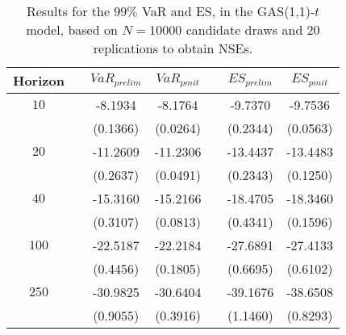 \begin{table}[h] 
\centering 
\caption{Results for the $99\%$ VaR and ES, in the GAS(1,1)-$t$ model, based on $N=10000$ candidate draws and $20$ replications to obtain NSEs.} 
\label{tab:res_pmit_t_gas} 
\begin{tabular}{ccccccc}  
 Horizon & & $VaR_{prelim}$ & $VaR_{pmit}$ & & $ES_{prelim}$ & $ES_{pmit}$ \\ \hline 
$10$ & & -8.1934 & -8.1764 & & -9.7370 & -9.7536  \\ 
 & & (0.1366) & (0.0264) & & (0.2344) & (0.0563)   \\ [1ex] 
$20$ & & -11.2609 & -11.2306 & & -13.4437 & -13.4483  \\ 
 & & (0.2637) & (0.0491) & & (0.2343) & (0.1250)   \\ [1ex] 
$40$ & & -15.3160 & -15.2166 & & -18.4705 & -18.3460  \\ 
 & & (0.3107) & (0.0813) & & (0.4341) & (0.1596)   \\ [1ex] 
$100$ & & -22.5187 & -22.2184 & & -27.6891 & -27.4133  \\ 
 & & (0.4456) & (0.1805) & & (0.6695) & (0.6102)   \\ [1ex] 
$250$ & & -30.9825 & -30.6404 & & -39.1676 & -38.6508  \\ 
 & & (0.9055) & (0.3916) & & (1.1460) & (0.8293)   \\ [1ex] 
\hline 
\end{tabular} 
\end{table} 
